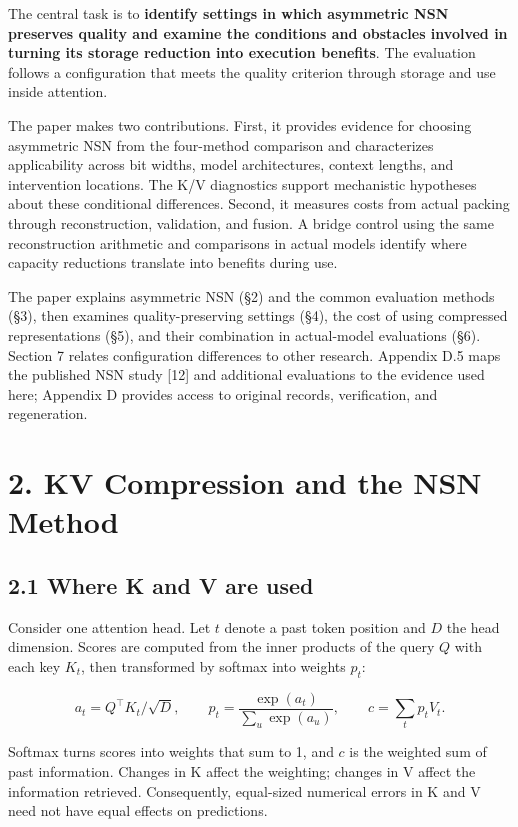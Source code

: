 \documentclass[10pt,a4paper]{article}
\begin{document}
The central task is to \textbf{identify settings in which asymmetric NSN preserves quality and examine the conditions and obstacles involved in turning its storage reduction into execution benefits}. The evaluation follows a configuration that meets the quality criterion through storage and use inside attention.

The paper makes two contributions. First, it provides evidence for choosing asymmetric NSN from the four-method comparison and characterizes applicability across bit widths, model architectures, context lengths, and intervention locations. The K/V diagnostics support mechanistic hypotheses about these conditional differences. Second, it measures costs from actual packing through reconstruction, validation, and fusion. A bridge control using the same reconstruction arithmetic and comparisons in actual models identify where capacity reductions translate into benefits during use.

The paper explains asymmetric NSN (§2) and the common evaluation methods (§3), then examines quality-preserving settings (§4), the cost of using compressed representations (§5), and their combination in actual-model evaluations (§6). Section 7 relates configuration differences to other research. Appendix D.5 maps the published NSN study {[}12{]} and additional evaluations to the evidence used here; Appendix D provides access to original records, verification, and regeneration.

\section{2. KV Compression and the NSN Method}\label{kv-compression-and-the-nsn-method}

\subsection{2.1 Where K and V are used}\label{where-k-and-v-are-used}

Consider one attention head. Let \(t\) denote a past token position and \(D\) the head dimension. Scores are computed from the inner products of the query \(Q\) with each key \(K_t\), then transformed by softmax into weights \(p_t\):

\[
a_t=Q^\top K_t/\sqrt D,\qquad
p_t=\frac{\exp(a_t)}{\sum_u\exp(a_u)},\qquad
c=\sum_t p_tV_t.
\]

Softmax turns scores into weights that sum to 1, and \(c\) is the weighted sum of past information. Changes in K affect the weighting; changes in V affect the information retrieved. Consequently, equal-sized numerical errors in K and V need not have equal effects on predictions.
\end{document}
